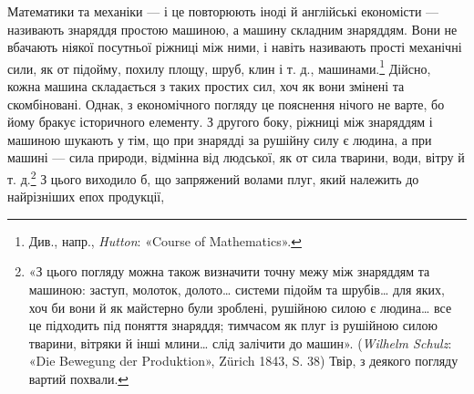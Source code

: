 Математики та механіки — і це повторюють іноді й англійські
економісти — називають знаряддя простою машиною, а машину
складним знаряддям. Вони не вбачають ніякої посутньої
ріжниці між ними, і навіть називають прості механічні сили,
як от підойму, похилу площу, шруб, клин і т. д., машинами.\footnote{
Див., напр., \emph{Hutton}: «Course of Mathematics».
} Дійсно, кожна машина складається з таких простих сил,
хоч як вони змінені та скомбіновані. Однак, з економічного погляду
це пояснення нічого не варте, бо йому бракує історичного
елементу. З другого боку, ріжниці між знаряддям і машиною
шукають у тім, що при знарядді за рушійну силу є людина, а
при машині — сила природи, відмінна від людської, як от сила
тварини, води, вітру й т. д.\footnote{
«З цього погляду можна також визначити точну межу між знаряддям
та машиною: заступ, молоток, долото\dots{} системи підойм та шрубів\dots{}
для яких, хоч би вони й як майстерно були зроблені, рушійною силою є
людина\dots{} все це підходить під поняття знаряддя; тимчасом як плуг із
рушійною силою тварини, вітряки й інші млини\dots{} слід залічити до машин».
(\emph{Wilhelm Schulz}: «Die Bewegung der Produktion», Zürich 1843, S. 38)
Твір, з деякого погляду вартий похвали.
} З цього виходило б, що запряжений
волами плуг, який належить до найрізніших епох продукції,
\parbreak{}  %
